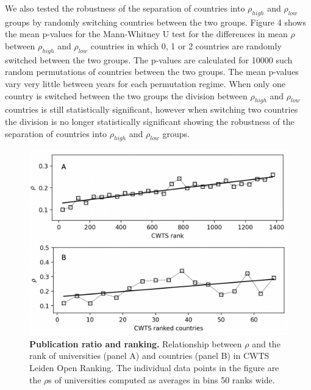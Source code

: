 \documentclass[amsfonts, amssymb, prl, superscriptaddress, notitlepage, twocolumn, nofootinbib]{revtex4-2}
\begin{document}
We also tested the robustness of the separation of countries into $\rho_{high}$ and $\rho_{low}$ groups by randomly switching countries between the two groups. Figure 4 shows the mean p-values for the Mann-Whitney U test for the differences in mean $\rho$ between $\rho_{high}$ and $\rho_{low}$ countries in which 0, 1 or 2 countries are randomly switched between the two groups. The p-values are calculated for 10000 such random permutations of countries between the two groups. The mean p-values vary very little between years for each permutation regime. When only one country is switched between the two groups the division between $\rho_{high}$ and $\rho_{low}$ countries is still statistically significant, however when switching two countries the division is no longer statistically significant showing the robustness of the separation of countries into $\rho_{high}$ and $\rho_{low}$ groups. 

\begin{figure}
    \centering
    \includegraphics[width=1.0\linewidth]{Fig03f.png}
    \caption{\label{fig:fig5} {\bf Publication ratio and ranking.} Relationship between $\rho$ and the rank of universities (panel A) and countries (panel B) in CWTS Leiden Open Ranking. The individual data points in the figure are the $\rho$s of universities computed as averages in bins 50 ranks wide.  
}
\end{figure}
\end{document}
